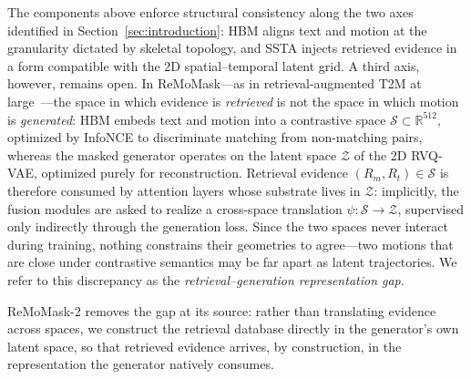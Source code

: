The components above enforce structural consistency along the two axes identified in Section~\ref{sec:introduction}: HBM aligns text and motion at the granularity dictated by skeletal topology, and SSTA injects retrieved evidence in a form compatible with the 2D spatial--temporal latent grid. A third axis, however, remains open. In ReMoMask---as in retrieval-augmented T2M at large~\cite{remodiffuse,remogpt,morag}---the space in which evidence is \emph{retrieved} is not the space in which motion is \emph{generated}: HBM embeds text and motion into a contrastive space $\mathcal{S} \subset \mathbb{R}^{512}$, optimized by InfoNCE to discriminate matching from non-matching pairs, whereas the masked generator operates on the latent space $\mathcal{Z}$ of the 2D RVQ-VAE, optimized purely for reconstruction. Retrieval evidence $(R_m, R_t) \in \mathcal{S}$ is therefore consumed by attention layers whose substrate lives in $\mathcal{Z}$: implicitly, the fusion modules are asked to realize a cross-space translation $\psi: \mathcal{S} \rightarrow \mathcal{Z}$, supervised only indirectly through the generation loss. Since the two spaces never interact during training, nothing constrains their geometries to agree---two motions that are close under contrastive semantics may be far apart as latent trajectories. We refer to this discrepancy as the \emph{retrieval--generation representation gap}.

ReMoMask-2 removes the gap at its source: rather than translating evidence across spaces, we construct the retrieval database directly in the generator's own latent space, so that retrieved evidence arrives, by construction, in the representation the generator natively consumes.

